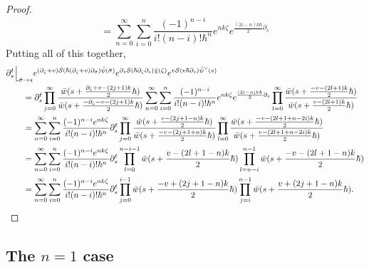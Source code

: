 \documentclass[10pt,a4paper,oneside,no-math,reqno]{amsart}%
\theoremstyle{plain}
\theoremstyle{definition}
\theoremstyle{remark}
\numberwithin{equation}{section}
\newcommand{\mc}[1]{\mathcal{#1}}
\newcommand{\1}{\mathds{1}}
\newcommand{\<}{\langle}
\renewcommand{\>}{\rangle}
\newcommand{\del}{\partial}
\begin{document}
\begin{proof}
\begin{equation}
		=
		\sum_{n=0}^\infty \sum_{i = 0}^n \frac{(-1)^{n-i}}{i!(n-i)!\hbar^n} e^{nk\zeta}  e^{\frac{(2i-n)k \hbar}{2} \del_s} 
	\end{equation}
	Putting all of this together,
	\begin{align*}
			&
			\del_s^t \Big\lfloor_{\bar{\sigma} \to s}
			e^{ (\del_\zeta + v) \mc{S}( \hbar (\del_\zeta + v) \del_{\bar{\sigma}} )\tilde{\psi} (\bar{\sigma}) }
			e^{ \del_s \mc{S}( \hbar \del_\zeta \del_s) \tilde{\chi} (\zeta) }
			e^{v \mc{S}(v \hbar \del_s ) \tilde{\psi}^\vee (s)}
			\\
			&\qquad=
			\del_s^t
			\prod_{j = 0}^ \infty \frac{\bar{w} ( s + \frac{\del_\zeta + v- (2j + 1) k}{2} \hbar)}{\bar{w} ( s + \frac{- \del_\zeta -v- (2j + 1) k}{2} \hbar)}
			\sum_{n=0}^\infty \sum_{i = 0}^n \frac{(-1)^{n-i}}{i!(n-i)!\hbar^n} e^{nk\zeta}  e^{\frac{(2i-n)k \hbar}{2} \del_s}
			\prod_{l = 0}^ \infty \frac{\bar{w} (s + \frac{-v- (2l + 1) k}{2} \hbar)}{\bar{w} (s + \frac{v- (2l + 1) k}{2} \hbar)}
			\\
			&\qquad=
			\sum_{n=0}^\infty \sum_{i = 0}^n \frac{(-1)^{n-i} e^{ nk \zeta} }{i!(n-i)! \hbar^n } 
			\del_s^t
			\prod_{j = 0}^ \infty \frac{\bar{w} ( s + \frac{ v- (2j + 1 - n) k}{2} \hbar)}{\bar{w} ( s + \frac{-v- (2j + 1 + n) k}{2} \hbar)}
			\prod_{l = 0}^ \infty \frac{\bar{w} ( s + \frac{-v- (2l + 1 + n - 2i) k}{2} \hbar)}{\bar{w} ( s + \frac{v- (2l + 1 + n - 2i) k}{2} \hbar)}
			\\ 						%
			&\qquad=
			\sum_{n=0}^\infty \sum_{i = 0}^n \frac{(-1)^{n-i} e^{ nk \zeta} }{i!(n-i)! \hbar^n } 
			\del_s^t
			\prod_{l = 0}^{n-i-1} \bar{w} ( s + \frac{ v- (2l + 1 - n) k}{2} \hbar)
			\prod_{l = n-i}^{n-1} \bar{w} ( s + \frac{-v- (2l + 1 - n) k}{2} \hbar)
			\\
			&\qquad=
			\sum_{n=0}^\infty \sum_{i = 0}^n \frac{(-1)^{n-i} e^{ nk \zeta}}{i!(n-i)! \hbar^n } 
			\del_s^t
			\prod_{j = 0}^{i-1} \bar{w} ( s + \frac{-v+ (2j+1-n) k}{2} \hbar)
			\prod_{j = i}^{n-1} \bar{w} ( s + \frac{ v+ (2j+1-n) k}{2} \hbar) . \qedhere
	\end{align*}
\end{proof}

\subsection{The \texorpdfstring{$n=1$}{n=1} case}
\end{document}
